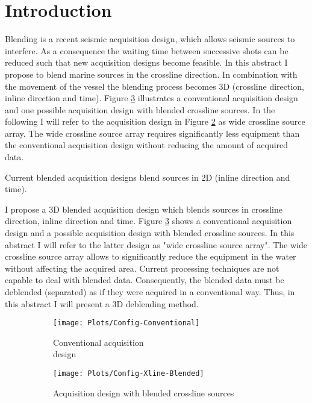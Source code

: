 \documentclass{madrid15WS}
\begin{document}
\section{Introduction}

Blending is a recent seismic acquisition design, which allows seismic sources to interfere. As a consequence the waiting time between successive shots can be reduced such that new acquisition designs become feasible. In this abstract I propose to blend marine sources in the crossline direction. In combination with the movement of the vessel the blending process becomes 3D (crossline direction, inline direction and time). Figure \ref{fig:Intro-Configs} illustrates a conventional acquisition design and one possible acquisition design with blended crossline sources. In the following I will refer to the acquisition design in Figure \ref{fig:Intro-Config-Xline-Blended} as wide crossline source array. The wide crossline source array requires significantly less equipment than the conventional acquisition design without reducing the amount of acquired data.

Current blended acquisition designs blend sources in 2D (inline direction and time). 



I propose a 3D blended acquisition design which blends sources in crossline direction, inline direction and time. Figure \ref{fig:Intro-Configs} shows a conventional acquisition design and a possible acquisition design with blended crossline sources. In this abstract I will refer to the latter design as "wide crossline source array". The wide crossline source array allows to significantly reduce the equipment in the water without affecting the acquired area. Current processing techniques are not capable to deal with blended data. Consequently, the blended data must be deblended (separated) as if they were acquired in a conventional way. Thus, in this abstract I will present a 3D deblending method.

\begin{figure}[h!]
	\centering
	\begin{subfigure}[t]{0.3\textwidth}
		\centering
		\texttt{[image: Plots/Config-Conventional]}
		\caption{Conventional acquisition \\design}
		\label{fig:Intro-Config-Conventional}
	\end{subfigure}
	\qquad \qquad 
	\centering
	\begin{subfigure}[t]{0.3\textwidth}
		\centering
		\texttt{[image: Plots/Config-Xline-Blended]}
		\caption{Acquisition design with blended crossline sources}
		\label{fig:Intro-Config-Xline-Blended}
	\end{subfigure}
	
	\caption{}
	\label{fig:Intro-Configs}
	
\end{figure}
\end{document}
